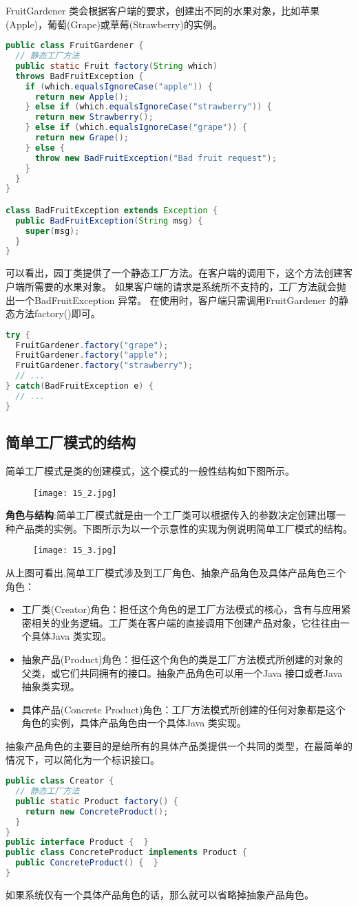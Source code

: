 \documentclass[../main.tex]{subfiles}
\begin{document}
FruitGardener 类会根据客户端的要求，创建出不同的水果对象，比如苹果(Apple)，葡萄(Grape)或草莓(Strawberry)的实例。
\begin{lstlisting}[language=java]
public class FruitGardener {
  // 静态工厂方法
  public static Fruit factory(String which)
  throws BadFruitException {
    if (which.equalsIgnoreCase("apple")) {
      return new Apple();
    } else if (which.equalsIgnoreCase("strawberry")) {
      return new Strawberry();
    } else if (which.equalsIgnoreCase("grape")) {
      return new Grape();
    } else {
      throw new BadFruitException("Bad fruit request");
    }
  }
}

class BadFruitException extends Exception {
  public BadFruitException(String msg) {
    super(msg);
  }
}
\end{lstlisting}
可以看出，园丁类提供了一个静态工厂方法。在客户端的调用下，这个方法创建客户端所需要的水果对象。
如果客户端的请求是系统所不支持的，工厂方法就会抛出一个BadFruitException 异常。
在使用时，客户端只需调用FruitGardener 的静态方法factory()即可。
\begin{lstlisting}[language=java]
try {
  FruitGardener.factory("grape");
  FruitGardener.factory("apple");
  FruitGardener.factory("strawberry");
  // ...
} catch(BadFruitException e) {
  // ...
}
\end{lstlisting}
%
\subsection{简单工厂模式的结构}
简单工厂模式是类的创建模式，这个模式的一般性结构如下图所示。
\begin{figure}[H]
  \texttt{[image: 15\_2.jpg]}
\end{figure}
\textbf{角色与结构}:简单工厂模式就是由一个工厂类可以根据传入的参数决定创建出哪一种产品类的实例。下图所示为以一个示意性的实现为例说明简单工厂模式的结构。
\begin{figure}[H]
  \texttt{[image: 15\_3.jpg]}
\end{figure}
%
\noindent 从上图可看出,简单工厂模式涉及到工厂角色、抽象产品角色及具体产品角色三个角色：
%
\begin{itemize}
  \item 工厂类(Creator)角色：担任这个角色的是工厂方法模式的核心，含有与应用紧密相关的业务逻辑。工厂类在客户端的直接调用下创建产品对象，它往往由一个具体Java 类实现。
  \item 抽象产品(Product)角色：担任这个角色的类是工厂方法模式所创建的对象的父类，或它们共同拥有的接口。抽象产品角色可以用一个Java 接口或者Java 抽象类实现。
  \item 具体产品(Concrete Product)角色：工厂方法模式所创建的任何对象都是这个角色的实例，具体产品角色由一个具体Java 类实现。
\end{itemize}
抽象产品角色的主要目的是给所有的具体产品类提供一个共同的类型，在最简单的情况下，可以简化为一个标识接口。
%
\begin{lstlisting}[language=java]
public class Creator {
  // 静态工厂方法
  public static Product factory() {
    return new ConcreteProduct();
  }
}
public interface Product {  }
public class ConcreteProduct implements Product {
  public ConcreteProduct() {  }
}
\end{lstlisting}
如果系统仅有一个具体产品角色的话，那么就可以省略掉抽象产品角色。
%
\end{document}
